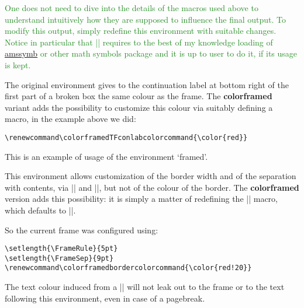 \documentclass[a4paper,dvipdfmx,11pt]{article}
\def\colorframedTFconlabcolorcommand{\color{red}}
\def\colorframedbordercolorcommand{\color{red!20}}
\def\ctanpackage#1{\href{https://ctan.org/pkg/#1}{#1}}
\newcommand\colorframed{%
        \texorpdfstring{{\color{joli}\bfseries colorframed}}{colorframed}\xspace}
\begin{document}
\begin{snugshade*}\textcolor{ForestGreen}{%
  One does not need to dive into the details of the macros
  used above to understand intuitively how they are supposed
  to influence the final output.  To modify this output,
  simply redefine this environment with suitable changes.
  Notice in particular that \expandafter|\string\blacktriangleright| requires to
  the best of my knowledge loading of \ctanpackage{amssymb} or
  other math symbols package and it is up to user to do it, if
  its usage is kept.}

The original environment gives to the continuation label at
bottom right of the first part of a broken box the same colour
as the frame.  The \colorframed variant adds the possibility
to customize this colour via suitably defining a macro, in the
example above we did:
\begin{verbatim}
\renewcommand\colorframedTFconlabcolorcommand{\color{red}}
\end{verbatim}
\end{snugshade*}

\begin{framed}
  This is an example of usage of the environment `framed'.

  This environment allows customization of the border width
  and of the separation with contents, via |\FrameRule| and
  |\FrameSep|, but not of the colour of the border.  The
  \colorframed version adds this possibility: it is simply a
  matter of redefining the |\colorframedbordercolorcommand|
  macro, which defaults to |\normalcolor|.

\color{blue}
  So the current frame was configured using:
\begin{verbatim}
\setlength{\FrameRule}{5pt}
\setlength{\FrameSep}{9pt}
\renewcommand\colorframedbordercolorcommand{\color{red!20}}
\end{verbatim}
  The text colour induced from a |\color{blue}|
  will not leak out to the frame or to the text following this
  environment, even in case of a pagebreak.
\end{framed}
\end{document}
